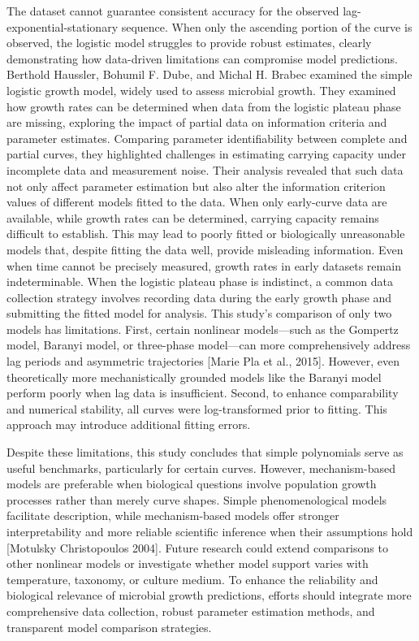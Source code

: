 \documentclass{article}
\begin{document}
The dataset cannot guarantee consistent accuracy for the observed lag-exponential-stationary sequence. When only the ascending portion of the curve is observed, the logistic model struggles to provide robust estimates, clearly demonstrating how data-driven limitations can compromise model predictions. Berthold Haussler, Bohumil F. Dube, and Michal H. Brabec examined the simple logistic growth model, widely used to assess microbial growth. They examined how growth rates can be determined when data from the logistic plateau phase are missing, exploring the impact of partial data on information criteria and parameter estimates. Comparing parameter identifiability between complete and partial curves, they highlighted challenges in estimating carrying capacity under incomplete data and measurement noise. Their analysis revealed that such data not only affect parameter estimation but also alter the information criterion values of different models fitted to the data. When only early-curve data are available, while growth rates can be determined, carrying capacity remains difficult to establish. This may lead to poorly fitted or biologically unreasonable models that, despite fitting the data well, provide misleading information. Even when time cannot be precisely measured, growth rates in early datasets remain indeterminable. When the logistic plateau phase is indistinct, a common data collection strategy involves recording data during the early growth phase and submitting the fitted model for analysis.
This study's comparison of only two models has limitations. First, certain nonlinear models—such as the Gompertz model, Baranyi model, or three-phase model—can more comprehensively address lag periods and asymmetric trajectories [Marie Pla et al., 2015]. However, even theoretically more mechanistically grounded models like the Baranyi model perform poorly when lag data is insufficient. Second, to enhance comparability and numerical stability, all curves were log-transformed prior to fitting. This approach may introduce additional fitting errors.

Despite these limitations, this study concludes that simple polynomials serve as useful benchmarks, particularly for certain curves. However, mechanism-based models are preferable when biological questions involve population growth processes rather than merely curve shapes. Simple phenomenological models facilitate description, while mechanism-based models offer stronger interpretability and more reliable scientific inference when their assumptions hold [Motulsky Christopoulos 2004]. Future research could extend comparisons to other nonlinear models or investigate whether model support varies with temperature, taxonomy, or culture medium. To enhance the reliability and biological relevance of microbial growth predictions, efforts should integrate more comprehensive data collection, robust parameter estimation methods, and transparent model comparison strategies.
\end{document}
